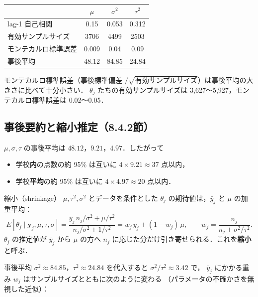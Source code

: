 \documentclass[lualatex,ja=standard,a4paper,12pt]{bxjsarticle}
\begin{document}
\begin{center}
\renewcommand{\arraystretch}{1.4}
\begin{tabular}{lccc}
\toprule
 & $\mu$ & $\sigma^2$ & $\tau^2$ \\
\midrule
lag-1 自己相関 & 0.15 & 0.053 & 0.312 \\
有効サンプルサイズ & 3706 & 4499 & 2503 \\
モンテカルロ標準誤差 & 0.009 & 0.04 & 0.09 \\
事後平均 & 48.12 & 84.85 & 24.84 \\
\bottomrule
\end{tabular}
\end{center}

\noindent モンテカルロ標準誤差（事後標準偏差 $/\sqrt{\text{有効サンプルサイズ}}$）は事後平均の大きさに比べて十分小さい．
$\theta_j$ たちの有効サンプルサイズは 3,627〜5,927，モンテカルロ標準誤差は 0.02〜0.05．

\subsection{事後要約と縮小推定（8.4.2節）}

$\mu, \sigma, \tau$ の事後平均は $48.12$，$9.21$，$4.97$．したがって
\begin{itemize}
  \item 学校\textbf{内}の点数の約 95\% は互いに $4 \times 9.21 \approx 37$ 点以内，
  \item 学校\textbf{平均}の約 95\% は互いに $4 \times 4.97 \approx 20$ 点以内．
\end{itemize}

\begin{defbox}{縮小（shrinkage）}
$\mu, \tau^2, \sigma^2$ とデータを条件とした $\theta_j$ の期待値は，$\bar{y}_j$ と $\mu$ の加重平均：
\[
  E[\theta_j \mid \bm{y}_j, \mu, \tau, \sigma]
  = \frac{\bar{y}_j\, n_j/\sigma^2 + \mu/\tau^2}{n_j/\sigma^2 + 1/\tau^2}
  = w_j\,\bar{y}_j + (1 - w_j)\,\mu,
  \qquad w_j = \frac{n_j}{n_j + \sigma^2/\tau^2}.
\]
$\theta_j$ の推定値が $\bar{y}_j$ から $\mu$ の方へ $n_j$ に応じた分だけ引き寄せられる．これを\textbf{縮小}と呼ぶ．
\end{defbox}

\noindent 事後平均 $\sigma^2 \approx 84.85$，$\tau^2 \approx 24.84$ を代入すると $\sigma^2/\tau^2 \approx 3.42$ で，
$\bar{y}_j$ にかかる重み $w_j$ はサンプルサイズとともに次のように変わる
（パラメータの不確かさを無視した近似）：
\end{document}
